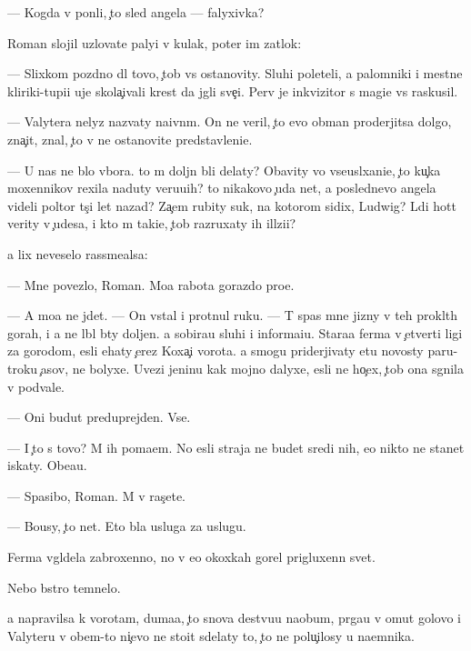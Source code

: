 \documentclass[10pt]{book}
\begin{document}
— Kogda v{\yi} pon{\ia}li, {\c}to sled angela — falyxivka?

Roman slojil uzlovat{\yi}{\y}e paly{\q}i v kulak, poter im zat{\yi}lok:

— Slixkom pozdno dl{\ia} tovo, {\c}tob{\yi} vs{\e} ostanovity. Sluhi poleteli, a palomniki i mestn{\yi}{\y}e kliriki-tupi{\q}i uje skola{\c}ivali krest da jgli sve{\c}i. Perv{\yi}{\y} je inkvizitor s magi{\y}e{\y} vs{\e} raskusil.

— Valytera nelyz{\ia} nazvaty naivn{\yi}m. On ne veril, {\c}to {\y}evo obman proderjitsa dolgo, zna{\c}it, znal, {\c}to v{\yi} ne ostanovite predstavleni{\y}e.

— U nas ne b{\yi}lo v{\yi}bora. {\C}to m{\yi} doljn{\yi} b{\yi}li delaty? Ob{\y}avity vo vseusl{\yi}xani{\y}e, {\c}to ku{\c}ka moxennikov rexila naduty veru{\y}u{\x}ih? {\C}to nikakovo {\c}uda net, a poslednevo angela videli poltor{\yi} t{\yi}s{\ia}{\c}i let nazad? Za{\c}em rubity suk, na kotorom sidix, Ludwig? L{\iu}di hot{\ia}t verity v {\c}udesa, i kto m{\yi} taki{\y}e, {\c}tob{\yi} razruxaty ih ill{\iu}zi{\y}i?

{\Y}a lix neveselo rassme{\y}alsa:

— Mne povezlo, Roman. Mo{\y}a rabota gorazdo pro{\x}e.

— A mo{\y}a ne jdet. — On vstal i prot{\ia}nul ruku. — T{\yi} spas mne jizny v teh prokl{\ia}t{\yi}h gorah, i {\y}a ne l{\iu}bl{\iu} b{\yi}ty doljen. {\Y}a sobira{\y}u sluhi i informa{\q}i{\y}u. Stara{\y}a ferma v {\c}etverti ligi za gorodom, {\y}esli {\y}ehaty {\c}erez Koxa{\c}{\yf}i vorota. {\Y}a smogu priderjivaty etu novosty paru-tro{\y}ku {\c}asov, ne bolyxe. Uvezi jen{\x}inu kak mojno dalyxe, {\y}esli ne ho{\c}ex, {\c}tob{\yi} ona sgnila v podvale.

— Oni budut preduprejden{\yi}. Vse.

— I {\c}to s tovo? M{\yi} ih po{\y}ma{\y}em. No {\y}esli straja ne budet sredi nih, {\y}e{\y}o nikto ne stanet iskaty. Obe{\x}a{\y}u.

— Spasibo, Roman. M{\yi} v ras{\c}ete.

— Bo{\y}usy, {\c}to net. Eto b{\yi}la usluga za uslugu.



Ferma v{\yi}gl{\ia}dela zabroxenno{\y}, no v {\y}e{\y}o okoxkah gorel prigluxenn{\yi}{\y} svet.

Nebo b{\yi}stro temnelo.

{\Y}a napravilsa k vorotam, duma{\y}a, {\c}to snova de{\y}stvu{\y}u naobum, pr{\yi}ga{\y}u v omut golovo{\y} i Valyteru v ob{\x}em-to ni{\c}evo ne sto{\y}it sdelaty to, {\c}to ne polu{\c}ilosy u na{\y}emnika.
\end{document}
